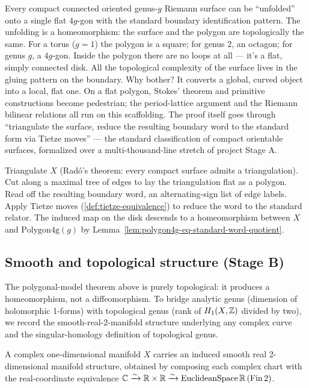 \begin{layman}
Every compact connected oriented genus-\(g\) Riemann surface can be
``unfolded'' onto a single flat \(4g\)-gon with the standard boundary
identification pattern. The unfolding is a homeomorphism: the surface
and the polygon are topologically the same. For a torus (\(g=1\))
the polygon is a square; for genus \(2\), an octagon; for genus
\(g\), a \(4g\)-gon. Inside the polygon there are no loops at all ---
it's a flat, simply connected disk. All the topological complexity
of the surface lives in the gluing pattern on the boundary. Why
bother? It converts a global, curved object into a local, flat one.
On a flat polygon, Stokes' theorem and primitive constructions
become pedestrian; the period-lattice argument and the Riemann
bilinear relations all run on this scaffolding. The proof itself
goes through ``triangulate the surface, reduce the resulting boundary
word to the standard form via Tietze moves'' --- the standard
classification of compact orientable surfaces, formalized over a
multi-thousand-line stretch of project Stage A.
\end{layman}

\begin{proofsketch}
Triangulate \(X\) (Rad\'o's theorem: every compact surface admits a
triangulation). Cut along a maximal tree of edges to lay the
triangulation flat as a polygon. Read off the resulting boundary
word, an alternating-sign list of edge labels. Apply Tietze moves
(\ref{def:tietze-equivalence}) to reduce the word to the standard
relator. The induced map on the disk descends to a homeomorphism
between \(X\) and \(\mathrm{Polygon4g}(g)\) by
Lemma~\ref{lem:polygon4g-eq-standard-word-quotient}.
\end{proofsketch}

\subsection{Smooth and topological structure (Stage B)}

The polygonal-model theorem above is purely topological: it produces
a homeomorphism, not a diffeomorphism. To bridge analytic genus
(dimension of holomorphic 1-forms) with topological genus (rank of
\(H_1(X,\mathbb{Z})\) divided by two), we record the smooth-real-2-manifold
structure underlying any complex curve and the singular-homology
definition of topological genus.

\begin{definition}
\label{def:smooth-real-structure}
A complex one-dimensional manifold \(X\) carries an induced smooth
real 2-dimensional manifold structure, obtained by composing each
complex chart with the real-coordinate equivalence
\(\mathbb{C} \xrightarrow{\sim} \mathbb{R}\times\mathbb{R} \xrightarrow{\sim}
\mathrm{EuclideanSpace}\,\mathbb{R}\,(\mathrm{Fin}\,2)\).
\leanok
\end{definition}

